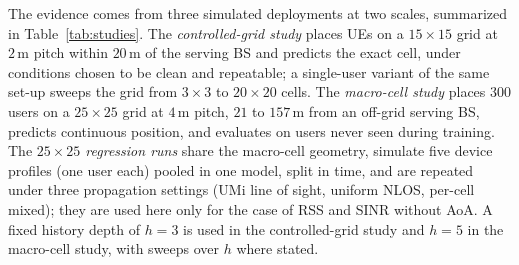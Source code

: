 The evidence comes from three simulated deployments at two scales, summarized in Table~\ref{tab:studies}. The \emph{controlled-grid study} places UEs on a $15\times15$ grid at $2\,\text{m}$ pitch within $20\,\text{m}$ of the serving BS and predicts the exact cell, under conditions chosen to be clean and repeatable; a single-user variant of the same set-up sweeps the grid from $3\times3$ to $20\times20$ cells. The \emph{macro-cell study} places $300$ users on a $25\times25$ grid at $4\,\text{m}$ pitch, $21$ to $157\,\text{m}$ from an off-grid serving BS, predicts continuous position, and evaluates on users never seen during training. The \emph{$25\times25$ regression runs} share the macro-cell geometry, simulate five device profiles (one user each) pooled in one model, split in time, and are repeated under three propagation settings (UMi line of sight, uniform NLOS, per-cell mixed); they are used here only for the case of RSS and SINR without AoA. A fixed history depth of $h=3$ is used in the controlled-grid study and $h=5$ in the macro-cell study, with sweeps over $h$ where stated.

